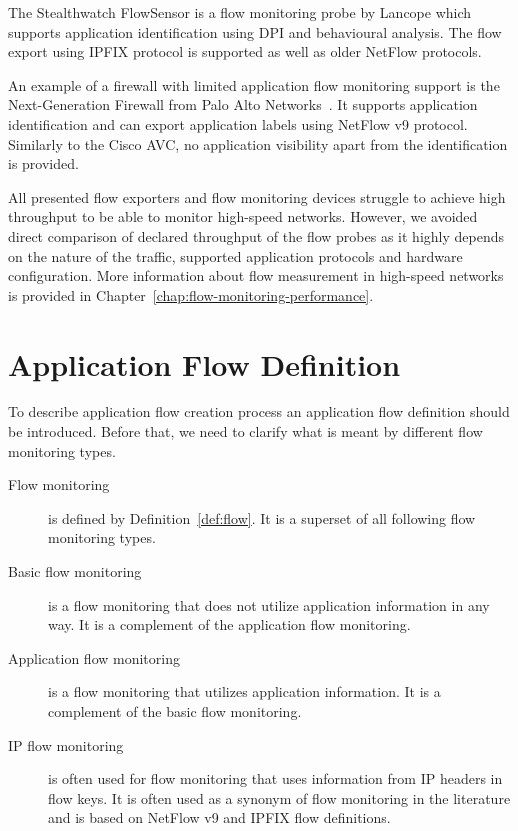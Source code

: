 The Stealthwatch FlowSensor\cite{Lancope--Stealthwatch} is a flow monitoring probe by Lancope which supports application identification using DPI and behavioural analysis. The flow export using IPFIX protocol is supported as well as older NetFlow protocols.

An example of a firewall with limited application flow monitoring support is the Next-Generation Firewall from Palo Alto Networks~\cite{PAN--Next}. It supports application identification and can export application labels using NetFlow v9 protocol. Similarly to the Cisco AVC, no application visibility apart from the identification is provided.

All presented flow exporters and flow monitoring devices struggle to achieve high throughput to be able to monitor high-speed networks. However, we avoided direct comparison of declared throughput of the flow probes as it highly depends on the nature of the traffic, supported application protocols and hardware configuration. More information about flow measurement in high-speed networks is provided in Chapter~\ref{chap:flow-monitoring-performance}.

\section{Application Flow Definition}\label{sec:app-flow-definition}

To describe application flow creation process an application flow definition should be introduced. Before that, we need to clarify what is meant by different flow monitoring types.

\begin{description}
  \item[Flow monitoring] is defined by Definition~\ref{def:flow}. It is a superset of all following flow monitoring types.
  \item[Basic flow monitoring] is a flow monitoring that does not utilize application information in any way. It is a complement of the application flow monitoring.
  \item[Application flow monitoring] is a flow monitoring that utilizes application information. It is a complement of the basic flow monitoring. 
  \item[IP flow monitoring] is often used for flow monitoring that uses information from IP headers in flow keys. It is often used as a synonym of flow monitoring in the literature and is based on NetFlow v9 and IPFIX flow definitions.
\end{description}

